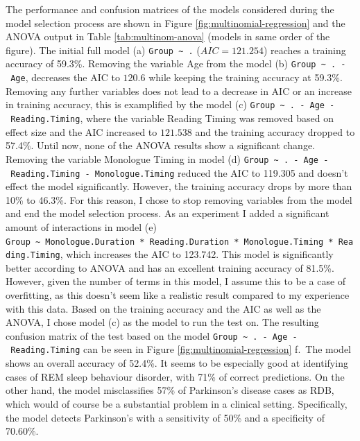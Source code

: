\documentclass[
  english,
  doc,floatsintext]{apa6}
\begin{document}
The performance and confusion matrices of the models considered during the model selection process are shown in Figure
\ref{fig:multinomial-regression} and the ANOVA output in Table \ref{tab:multinom-anova} (models in same order of the figure).
The initial full model (a) \texttt{Group\ \textasciitilde{}\ .} (\(AIC = 121.254\)) reaches a training accuracy of 59.3\%.
Removing the variable Age from the model (b) \texttt{Group\ \textasciitilde{}\ .\ -\ Age}, decreases the AIC to \(120.6\) while keeping the training accuracy at 59.3\%.
Removing any further variables does not lead to a decrease in AIC or an increase in training accuracy, this is examplified
by the model (c) \texttt{Group\ \textasciitilde{}\ .\ -\ Age\ -\ Reading.Timing}, where the variable Reading Timing was removed based on effect size
and the AIC increased to \(121.538\) and the training accuracy
dropped to 57.4\%. Until now, none of the ANOVA results show a significant change. Removing the variable Monologue Timing in model (d) \texttt{Group\ \textasciitilde{}\ .\ -\ Age\ -\ Reading.Timing\ -\ Monologue.Timing}
reduced the AIC to 119.305 and doesn't effect the model significantly. However, the training accuracy drops by more than 10\%
to 46.3\%. For this reason, I chose to stop removing variables from the model and end the model selection process.
As an experiment I added a significant amount of interactions in model (e) \texttt{Group\ \textasciitilde{}\ Monologue.Duration\ *\ Reading.Duration\ *\ Monologue.Timing\ *\ Reading.Timing},
which increases the AIC to 123.742. This model is significantly better according to ANOVA and has an excellent
training accuracy of 81.5\%. However, given the number of terms in this model, I assume this to be a case of overfitting, as this
doesn't seem like a realistic result compared to my experience with this data. Based on the training accuracy and the AIC as well
as the ANOVA, I chose model (c) as the model to run the test on. The resulting confusion matrix of the test based on the model
\texttt{Group\ \textasciitilde{}\ .\ -\ Age\ -\ Reading.Timing} can be seen in Figure \ref{fig:multinomial-regression} f.~The model shows an overall accuracy of 52.4\%.
It seems to be especially good at identifying cases of REM sleep behaviour disorder, with 71\% of correct predictions. On the other hand,
the model misclassifies 57\% of Parkinson's disease cases as RDB, which would of course be a substantial problem in a clinical setting.
Specifically, the model detects Parkinson's with a sensitivity of 50\% and a specificity of
70.60\%.
\end{document}
